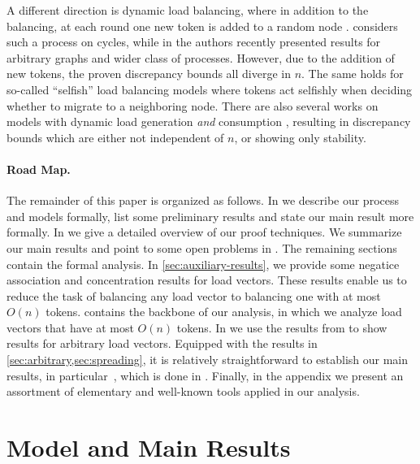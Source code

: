 \documentclass[twoside,leqno]{article}
\DeclareMathOperator{\1}{\mathbf{1}}
\numberwithin{equation}{section}
\begin{document}
A different direction is dynamic load balancing, where in addition to the balancing, at each round one new token is added to a random node \cite{DBLP:conf/icalp/BerenbrinkHHKR23,DBLP:journals/algorithmica/AlistarhNS22}.
\cite{DBLP:journals/algorithmica/AlistarhNS22} considers such a process on cycles, while in \cite{DBLP:conf/icalp/BerenbrinkHHKR23} the authors recently presented results for arbitrary graphs and wider class of processes. However, due to the addition of new tokens, the proven discrepancy bounds all diverge in $n$. The same holds for so-called ``selfish'' load balancing models \cite{DBLP:journals/talg/BerenbrinkHS14} where tokens act selfishly when deciding whether to migrate to a neighboring node. 
There are also several works on models with dynamic load generation \emph{and} consumption
\cite{DBLP:journals/siamcomp/AnagnostopoulosKU05,DBLP:conf/icalp/BerenbrinkFM05,DBLP:journals/siamcomp/BerenbrinkFG03}, resulting in discrepancy bounds which are either not independent of $n$, or showing only stability.






\paragraph{Road Map.} The remainder of this paper is organized as follows. In  we describe our process and models formally, list some preliminary results and state our main result more formally. In  we give a detailed overview of our proof techniques. We summarize our main results and point to some open problems in . The remaining sections contain the formal analysis. In \cref{sec:auxiliary-results}, we provide some negatice association and concentration results for load vectors. These results enable us to reduce the task of balancing any load vector to balancing one with at most $O(n)$ tokens.  contains the backbone of our analysis, in which we analyze load vectors that have at most $O(n)$ tokens. In  we use the results from  to show results for arbitrary load vectors. Equipped with the results in \cref{sec:arbitrary,sec:spreading}, it is relatively straightforward to establish our main results, in particular~, which is done in . Finally, in the appendix we present an assortment of elementary and well-known tools applied in our analysis. 


\section{Model and Main Results}\label{sec:model}
\end{document}
